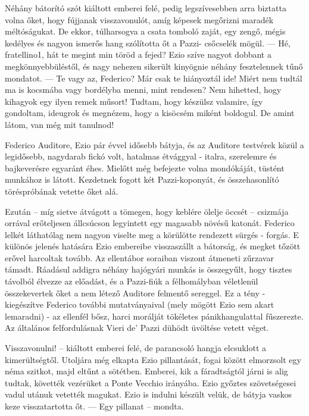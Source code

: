 \documentclass[12pt, a4paper, twoside]{report}
\theoremstyle{definition}
\theoremstyle{remark}
\begin{document}
Néhány  bátorító  szót  kiáltott  emberei  felé,  pedig 
legszívesebben arra biztatta volna őket, hogy fújjanak visszavonulót, 
amíg  képesek  megőrizni  maradék  méltóságukat.  De  ekkor, 
túlharsogva  a  csata  tomboló  zaját,  egy  zengő,  mégis  kedélyes  és 
nagyon ismerős hang szólította őt a Pazzi- csőcselék mögül. 
— Hé, fratellino1, hát te megint min töröd a fejed? 
Ezio szíve nagyot dobbant a megkönnyebbüléstől, és nagy nehezen 
sikerült kinyögnie néhány fesztelennek tűnő mondatot. 
— Te vagy az, Federico? Már csak te hiányoztál ide! Miért nem 
tudtál ma is kocsmába vagy bordélyba menni, mint rendesen? 
Nem hihetted, hogy kihagyok egy ilyen remek műsort! Tudtam, 
hogy  készülsz  valamire,  így  gondoltam,  ideugrok  és  megnézem, 
hogy a kisöcsém  miként boldogul. De amint  látom,  van  még  mit 
tanulnod! 

Federico Auditore, Ezio pár évvel idősebb bátyja, és az Auditore 
testvérek  közül  a  legidősebb,  nagydarab  fickó  volt,  hatalmas 
étvággyal - italra, szerelemre és bajkeverésre egyaránt éhes. Mielőtt 
még  befejezte  volna  mondókáját,  tüstént  munkához  is  látott. 
Kezdetnek  fogott  két  Pazzi-koponyát,  és  összehasonlító 
töréspróbának  vetette  őket  alá.  

Ezután  --  míg  sietve  átvágott  a tömegen, hogy keblére ölelje öccsét -- csizmája orrával erőteljesen állcsúcson legyintett egy magasabb növésű katonát. Federico lelkét láthatólag  nem  nagyon  viselte  meg  a  körülötte  rendezett  sürgés - forgás. E különös  jelenés  hatására  Ezio  embereibe  visszaszállt  a bátorság,  és  megket tőzött  erővel  harcoltak  tovább.  Az  ellentábor soraiban viszont átmeneti zűrzavar támadt. Ráadásul addigra néhány 
hajógyári  munkás  is  összegyűlt,  hogy  tisztes  távolból  élvezze  az 
előadást,  és  a  Pazzi-fiúk  a  félhomályban  véletlenül  összekevertek 
őket  a  nem  létező  Auditore  felmentő  sereggel.  Ez  a  tény  - 
kiegészítve Federico további mutatványaival (mely mögött Ezio sem 
akart  lemaradni) - az  ellenfél  bősz,  harci  morálját  tökéletes 
pánikhangulattal fűszerezte. 
Az általános felfordulásnak Vieri de' Pazzi dühödt üvöltése vetett véget. 

Visszavonulni! -- kiáltott  emberei  felé,  de  parancsoló  hangja 
elcsuklott  a  kimerültségtől.  Utoljára  még  elkapta  Ezio  pillantását, 
fogai  között  elmorzsolt  egy  néma  szitkot,  majd  eltűnt  a  sötétben.  
Emberei, kik a fáradtságtól járni is alig tudtak, követték vezérüket a 
Ponte  Vecchio  irányába.  Ezio  győztes  szövetségesei  vadul  utánuk 
vetették magukat. 
Ezio is indulni készült velük, de bátyja vaskos keze visszatartotta 
őt. — Egy pillanat -- mondta.
\end{document}
